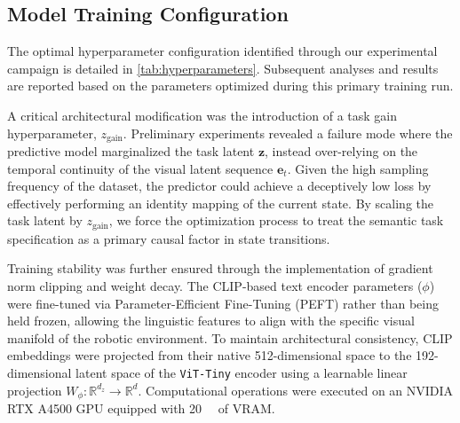 \subsection{Model Training Configuration}
\label{sec:model_training_config}

The optimal hyperparameter configuration identified through our experimental campaign is detailed in \cref{tab:hyperparameters}. Subsequent analyses and results are reported based on the parameters optimized during this primary training run.

A critical architectural modification was the introduction of a task gain hyperparameter, $z_\mathrm{gain}$. Preliminary experiments revealed a failure mode where the predictive model marginalized the task latent $\mathbf{z}$, instead over-relying on the temporal continuity of the visual latent sequence $\mathbf{e}_t$. Given the high sampling frequency of the dataset, the predictor could achieve a deceptively low loss by effectively performing an identity mapping of the current state. By scaling the task latent by $z_\mathrm{gain}$, we force the optimization process to treat the semantic task specification as a primary causal factor in state transitions.

Training stability was further ensured through the implementation of gradient norm clipping and weight decay. The CLIP-based text encoder parameters ($\phi$) were fine-tuned via Parameter-Efficient Fine-Tuning (PEFT) rather than being held frozen, allowing the linguistic features to align with the specific visual manifold of the robotic environment. To maintain architectural consistency, CLIP embeddings were projected from their native 512-dimensional space to the 192-dimensional latent space of the \texttt{ViT-Tiny} encoder using a learnable linear projection $W_\phi : \mathbb{R}^{d_z} \to \mathbb{R}^d$. Computational operations were executed on an NVIDIA RTX A4500 GPU equipped with \qty{20}{\giga\byte} of VRAM.

